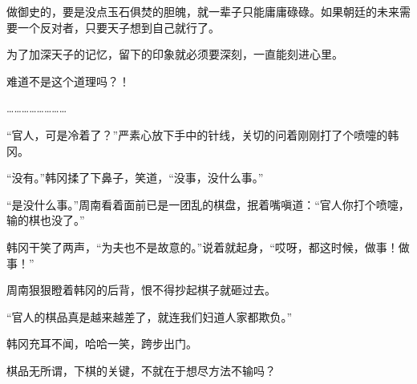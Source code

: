 做御史的，要是没点玉石俱焚的胆魄，就一辈子只能庸庸碌碌。如果朝廷的未来需要一个反对者，只要天子想到自己就行了。

为了加深天子的记忆，留下的印象就必须要深刻，一直能刻进心里。

难道不是这个道理吗？！

……………………

“官人，可是冷着了？”严素心放下手中的针线，关切的问着刚刚打了个喷嚏的韩冈。

“没有。”韩冈揉了下鼻子，笑道，“没事，没什么事。”

“是没什么事。”周南看着面前已是一团乱的棋盘，抿着嘴嗔道：“官人你打个喷嚏，输的棋也没了。”

韩冈干笑了两声，“为夫也不是故意的。”说着就起身，“哎呀，都这时候，做事！做事！”

周南狠狠瞪着韩冈的后背，恨不得抄起棋子就砸过去。

“官人的棋品真是越来越差了，就连我们妇道人家都欺负。”

韩冈充耳不闻，哈哈一笑，跨步出门。

棋品无所谓，下棋的关键，不就在于想尽方法不输吗？
